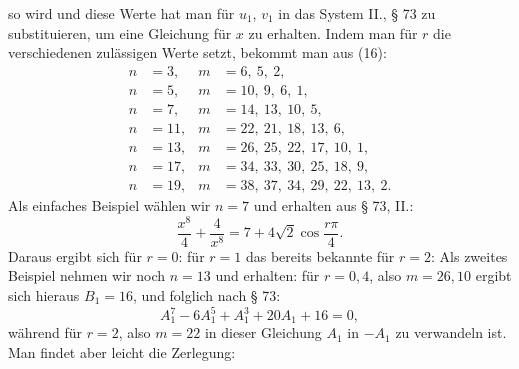 so wird
und diese Werte hat man für $u_1$, $v_1$ in das System II., § 73 zu
substituieren, um eine Gleichung für $x$ zu erhalten.
Indem man für $r$ die verschiedenen zulässigen Werte setzt,
bekommt man aus (16):
\[
\begin{aligned}
n &= 3, & m &= 6,\ 5,\ 2,\\
n &= 5, & m &= 10,\ 9,\ 6,\ 1,\\
n &= 7, & m &= 14,\ 13,\ 10,\ 5,\\
n &= 11, & m &= 22,\ 21,\ 18,\ 13,\ 6,\\
n &= 13, & m &= 26,\ 25,\ 22,\ 17,\ 10,\ 1,\\
n &= 17, & m &= 34,\ 33,\ 30,\ 25,\ 18,\ 9,\\
n &= 19, & m &= 38,\ 37,\ 34,\ 29,\ 22,\ 13,\ 2.
\end{aligned}
\]
Als einfaches Beispiel wählen wir $n = 7$ und erhalten aus
§ 73, II.:
\[ \frac{x^8}{4} + \frac{4}{x^8} = 7 + 4\sqrt2 \cos\frac{r\pi}{4}. \]
Daraus ergibt sich für $r = 0$:
für $r=1$ das bereits bekannte
für $r=2$:
Als zweites Beispiel nehmen wir noch $n = 13$ und erhalten:
für $r = 0, 4$, also $m = 26, 10$ ergibt sich hieraus $B_1 = 16$, und
folglich nach § 73:
\[ A_1^7 - 6A_1^5 + A_1^3 + 20A_1 + 16 = 0, \]
während für $r=2$, also $m=22$ in dieser Gleichung $A_1$ in
$-A_1$ zu verwandeln ist.
Man findet aber leicht die Zerlegung:
